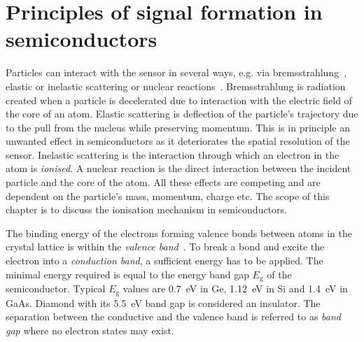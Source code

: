 \section{Principles of signal formation in semiconductors}
\label{sec:princsigfor}
Particles can interact with the sensor in several ways, e.g. via bremsstrahlung~\cite{BREMS:00000}, elastic or inelastic scattering or nuclear reactions~\cite{PARMA:00000}. Bremsstrahlung is radiation created when a particle is decelerated due to interaction with the electric field of the core of an atom. Elastic scattering is deflection of the particle's trajectory due to the pull from the nucleus while preserving momentum. This is in principle an unwanted effect in semiconductors as it deteriorates the spatial resolution of the sensor. Inelastic scattering is the interaction through which an electron in the atom is \emph{ionised}. A nuclear reaction is the direct interaction between the incident particle and the core of the atom. All these effects are competing and are dependent on the particle's mass, momentum, charge etc. The scope of this chapter is to discuss the ionisation mechanism in semiconductors.

The binding energy of the electrons forming valence bonds between atoms in the crystal lattice is within the \emph{valence band}~\cite{PHSEM:00000}. To break a bond and excite the electron into a \emph{conduction band}, a sufficient energy has to be applied. The minimal energy required is equal to the energy band gap $E_\mathrm{g}$ of the semiconductor. Typical $E_\mathrm{g}$ values are 0.7~eV in Ge, 1.12~eV in Si and 1.4~eV in GaAs. Diamond with its 5.5~eV band gap is considered an insulator. The separation between the conductive and the valence band is referred to as \emph{band gap} where no electron states may exist.


